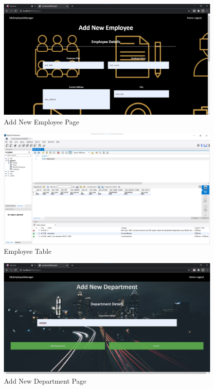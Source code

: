 \documentclass[12pt]{article}
\begin{document}
\begin{figure}
    \centering
    \includegraphics[width = \columnwidth]{screenshots/addnewemployeepage.png}
    \caption{Add New Employee Page}
    \label{fig:my_label}
\end{figure}

\begin{figure}
    \centering
    \includegraphics[width = \columnwidth]{screenshots/addnewemployeesql.png}
    \caption{Employee Table}
    \label{fig:my_label}
\end{figure}

\begin{figure}
    \centering
    \includegraphics[width = \columnwidth]{screenshots/addnewdeptpage.png}
    \caption{Add New Department Page}
    \label{fig:my_label}
\end{figure}
\end{document}
